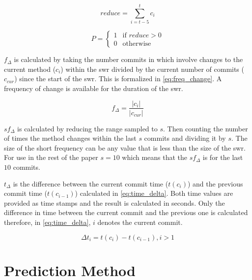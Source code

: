 \begin{equation} 
\label{eq:change_reduce}
reduce = \sum_{i=t-5}^{t}{c_i}
\end{equation}

\begin{equation} 
\label{eq:change_prev}
P = \left\{\begin{matrix}
1 & \text{if }reduce > 0 \\
0 & \text{otherwise}
\end{matrix}\right.
\end{equation}

$f_{\Delta}$ is calculated by taking the number commits in which involve changes to the current method ($c_i$) within the \gls{swr} divided by the current number of commits ($c_{cur}$) since the start of the \gls{swr}. This is formalized in \autoref{eq:freq_change}. A frequency of change is available for the duration of the \gls{swr}.

\begin{equation}
\label{eq:freq_change}
f_{\Delta} = \frac{|c_i|}{|c_{cur}|}
\end{equation}

$sf_{\Delta}$ is calculated by reducing the range sampled to $s$. Then counting the number of times the method changes within the last $s$ commits and dividing it by $s$. The size of the short frequency can be any value that is less than the size of the \gls{swr}. For use in the rest of the paper $s = 10$ which means that the $sf_{\Delta}$ is for the last $10$ commits.


$t_\Delta$ is the difference between the current commit time ($t(c_i)$) and the previous commit time ($t(c_{i-1})$) calculated in \autoref{eq:time_delta}. Both time values are provided as time stamps and the result is calculated in seconds. Only the difference in time between the current commit and the previous one is calculated therefore, in \autoref{eq:time_delta}, $i$ denotes the current commit.

\begin{equation}
\label{eq:time_delta}
\Delta t_{i} = t(c_i) - t(c_{i-1}), i > 1
\end{equation}

\section{Prediction Method}
\label{sec:prediction_method}

